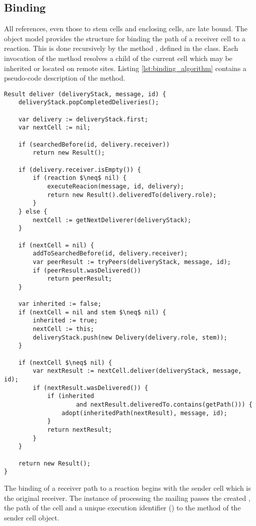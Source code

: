 \subsection{Binding}
\label{sec:binding}

All references, even those to stem cells and enclosing cells, are late bound. The object model provides the structure for binding the path of a receiver cell to a reaction. This is done recursively by the method , defined in the  class. Each invocation of the method resolves a child of the current cell which may be inherited or located on remote sites. Listing \ref{lst:binding_algorithm} contains a pseudo-code description of the  method.

\begin{lstlisting}[mathescape, float=htbp, label=lst:binding_algorithm, 
caption=Binding algorithm]
Result deliver (deliveryStack, message, id) {
	deliveryStack.popCompletedDeliveries();

	var delivery := deliveryStack.first;
	var nextCell := nil;

	if (searchedBefore(id, delivery.receiver)) 
		return new Result();

	if (delivery.receiver.isEmpty()) {
		if (reaction $\neq$ nil) {
			executeReacion(message, id, delivery);
			return new Result().deliveredTo(delivery.role);
		}
	} else {
		nextCell := getNextDeliverer(deliveryStack);
	}

	if (nextCell = nil) {
		addToSearchedBefore(id, delivery.receiver);
		var peerResult := tryPeers(deliveryStack, message, id);
		if (peerResult.wasDelivered())
			return peerResult;
	}

	var inherited := false;
	if (nextCell = nil and stem $\neq$ nil) {
		inherited := true;
		nextCell := this;
		deliveryStack.push(new Delivery(delivery.role, stem));
	}

	if (nextCell $\neq$ nil) {
		var nextResult := nextCell.deliver(deliveryStack, message, id);
		if (nextResult.wasDelivered()) {
			if (inherited 
					and nextResult.deliveredTo.contains(getPath())) {
				adopt(inheritedPath(nextResult), message, id);
			}
			return nextResult;
		}
	}

	return new Result();
}
\end{lstlisting}

The binding of a receiver path to a reaction begins with the sender cell which is the original receiver. The instance of  processing the mailing passes the created , the path of the  cell and a unique execution identifier () to the  method of the sender cell object.

